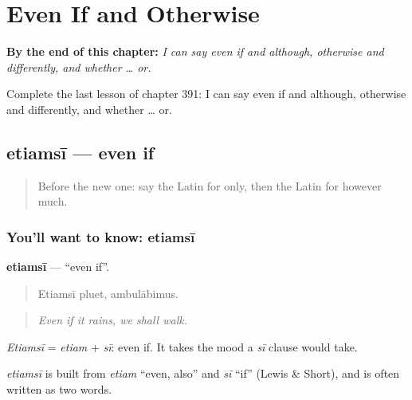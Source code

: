 
\chapter{Even If and Otherwise}
\label{ch:la-even-if-and-otherwise}

\begin{chapteropening}
\textbf{By the end of this chapter:} \emph{I can say even if and although, otherwise and differently, and whether … or.}

Complete the last lesson of chapter 391: I can say even if and although, otherwise and differently, and whether … or.
\end{chapteropening}

\section[etiamsī]{etiamsī — even if}

\label{lesson:LA-C391-etiamsi}



\begin{quote}
Before the new one: say the Latin for only, then the Latin for however much.
\end{quote}

\subsection*{You'll want to know: etiamsī}
\textbf{etiamsī} — \textquotedblleft{}even if\textquotedblright{}.

\begin{quote}
Etiamsī pluet, ambulābimus.
\end{quote}

\begin{quote}
\emph{Even if it rains, we shall walk.}
\end{quote}

\emph{Etiamsī} = \emph{etiam} + \emph{sī}: even if. It takes the mood a \emph{sī} clause would take.

\begin{cousinweb}
\emph{etiamsī} is built from \emph{etiam} \textquotedblleft{}even, also\textquotedblright{} and \emph{sī} \textquotedblleft{}if\textquotedblright{} (Lewis \& Short), and is often written as two words.
\end{cousinweb}


